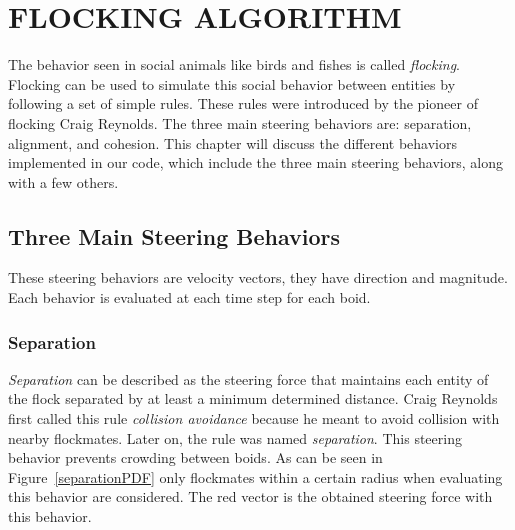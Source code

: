 \chapter{FLOCKING ALGORITHM}\label{chap3}

The behavior seen in social animals like birds and fishes is called \textit{flocking}. Flocking can be used to simulate this social behavior between entities by following a set of simple rules. These rules were introduced by the pioneer of flocking Craig Reynolds\cite{craig1}. The three main steering behaviors are: separation, alignment, and cohesion. This chapter will discuss the different behaviors implemented in our code, which include the three main steering behaviors, along with a few others.

\section{Three Main Steering Behaviors}
These steering behaviors are velocity vectors, they have direction and magnitude. Each behavior is evaluated at each time step for each boid.

\subsection{Separation}\label{separationsection}
\textit{Separation} can be described as the steering force that maintains each entity of the flock separated by at least a minimum determined distance. Craig Reynolds first called this rule \textit{collision avoidance} because he meant to avoid collision with nearby flockmates. Later on, the rule was named \textit{separation}. This steering behavior prevents crowding between boids. As can be seen in Figure~\ref{separationPDF} only flockmates within a certain radius when evaluating this behavior are considered. The red vector is the obtained steering force with this behavior.

